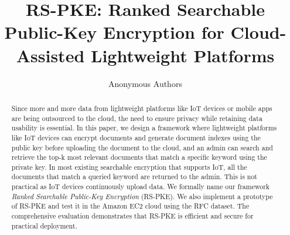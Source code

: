 \documentclass[sigconf,pdftex]{acmart}
\begin{document}
\title{RS-PKE: Ranked Searchable Public-Key Encryption for Cloud-Assisted Lightweight Platforms}

\author{Anonymous Authors}

\renewcommand{\shortauthors}{Anonymous authors}

\begin{abstract}
Since more and more data from lightweight platforms like IoT devices or mobile apps are being outsourced to the cloud, the need to ensure privacy while retaining data usability is essential. In this paper, we design a framework where lightweight platforms like IoT devices can encrypt documents and generate document indexes using the public key before uploading the document to the cloud, and an admin can search and retrieve the top-k most relevant documents that match a specific keyword using the private key. In most existing searchable encryption that supports IoT, all the documents that match a queried keyword are returned to the admin. This is not practical as IoT devices continuously upload data. We formally name our framework \textit{Ranked Searchable Public-Key Encryption} (RS-PKE). We also implement a prototype of RS-PKE and test it in the Amazon EC2 cloud using the RFC dataset. The comprehensive evaluation demonstrates that RS-PKE is efficient and secure for practical deployment.
\end{abstract}
\end{document}
